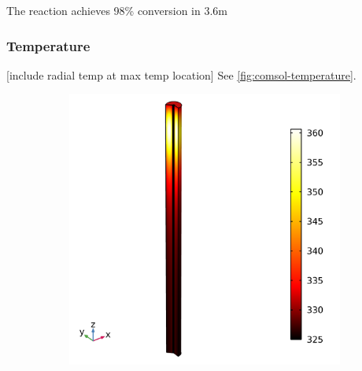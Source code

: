 The reaction achieves 98\% conversion in 3.6m 

\subsubsection{Temperature}
[include radial temp at max temp location]
See \cref{fig:comsol-temperature}.

\begin{figure}[h]
    \centering

    \begin{subfigure}{0.49\linewidth}
        \includegraphics[width=\linewidth, scale=0.5]{figures/temperature-surface.png}
        \caption{}
        \label{fig:comsol-temperature:surface}
    \end{subfigure}
    \begin{subfigure}{0.49\linewidth}

\end{subfigure}
\end{figure}
